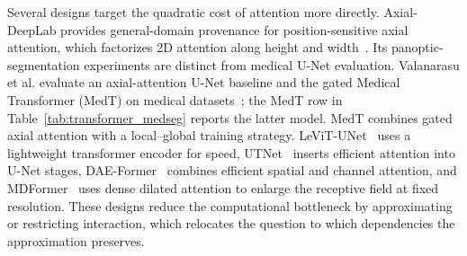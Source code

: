 \documentclass[5p,times,authoryear]{elsarticle}
\begin{document}
Several designs target the quadratic cost of attention more directly. Axial-DeepLab provides general-domain provenance for position-sensitive axial attention, which factorizes 2D attention along height and width~\citep{wang2020axial_verified}. Its panoptic-segmentation experiments are distinct from medical U-Net evaluation. Valanarasu et al. evaluate an axial-attention U-Net baseline and the gated Medical Transformer (MedT) on medical datasets~\citep{valanarasu2021medt_verified}; the MedT row in Table~\ref{tab:transformer_medseg} reports the latter model. MedT combines gated axial attention with a local--global training strategy. LeViT-UNet~\citep{xu2023levitunet} uses a lightweight transformer encoder for speed, UTNet~\citep{gao2021utnet} inserts efficient attention into U-Net stages, DAE-Former~\citep{reviewfix_azad2022daeformer} combines efficient spatial and channel attention, and MDFormer~\citep{li2025mdformer} uses dense dilated attention to enlarge the receptive field at fixed resolution. These designs reduce the computational bottleneck by approximating or restricting interaction, which relocates the question to which dependencies the approximation preserves.
\end{document}
